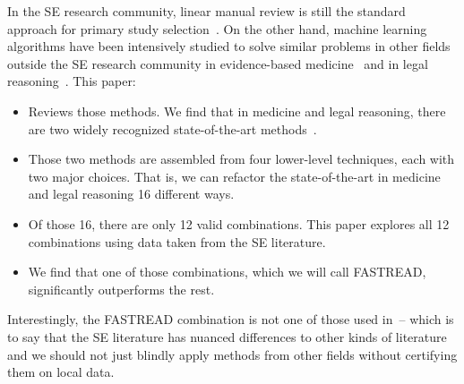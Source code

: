 \documentclass[final,twocolumn,5p]{elsarticle}
\theoremstyle{break}
\begin{document}
In the SE research community, linear manual review is still the standard approach for primary study selection~\cite{kitchenham2013systematic}. On the other hand, machine learning algorithms have been intensively studied to solve similar problems in other fields outside the SE research community in evidence-based medicine~\cite{wallace2010semi,wallace2010active} and in
legal reasoning~\cite{cormack2014evaluation,cormack2015autonomy}. This paper:
\begin{itemize}
\item
Reviews those methods. We find that in medicine and legal reasoning, there are two widely recognized state-of-the-art methods~\cite{cormack2014evaluation,wallace2010semi}.
\item
Those two methods are assembled from four lower-level techniques, each with two major choices.
That is, we can refactor the state-of-the-art in medicine and legal reasoning 16 different ways.
\item
Of those 16, there are only 12 valid combinations. This paper explores all 12 combinations using data taken from the SE literature.
\item
We find that one of those combinations, which we will call FASTREAD, significantly outperforms the rest.
\end{itemize}
Interestingly, the FASTREAD combination is not one of those used
in~\cite{cormack2014evaluation,wallace2010semi}-- which is to say that the SE literature has nuanced differences to other kinds of literature and we should not just blindly
apply methods from other fields without certifying them on local data.
\end{document}
